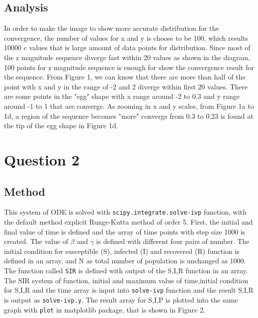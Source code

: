 \documentclass[12pt]{article}
\begin{document}
\subsection{Analysis}
In order to make the image to show more accurate distribution for the convergence, the number of values for x and y is choose to be 100, which results 10000 c values that is large amount of data points for distribution. Since most of the z magnitude sequence diverge fast within 20 values as shown in the diagram, 100 points for z magnitude sequence is enough for show the convergence result for the sequence. From Figure 1, we can know that there are more than half of the point with x and y in the range of -2 and 2 diverge within first 20 values. There are some points in the "egg" shape with x range around -2 to 0.3 and y range around -1 to 1 that are converge. As zooming in x and y scales, from Figure 1a to 1d, a region of the sequence becomes "more"  converge from 0.3 to 0.23 is found at the tip of the egg shape in Figure 1d.
\clearpage

\section{Question 2}

\subsection{Method}
This system of ODE is solved with \texttt{scipy.integrate.solve-ivp} function, with the default method explicit Runge-Kutta method of order 5.\cite{scipy} First, the initial and final value of time is defined and the array of time points with step size 1000 is created. The value of $\beta$ and $\gamma$ is defined with different four pairs of number. The initial condition for susceptible (S), infected (I) and recovered (R) function is defined in an array, and N as total number of population is unchanged as 1000.\cite{Lab} The function called \texttt{SIR} is defined with output of the S,I,R function in an array. \cite{Lab} The SIR system of function, initial and maximum value of time,initial condition for S,I,R and the time array is input into \texttt{solve-ivp} function and the result S,I,R is output as \texttt{solve-ivp.y}. The result array for S,I,P is plotted into the same graph with \texttt{plot} in matplotlib package, that is shown in Figure 2. 
\end{document}
